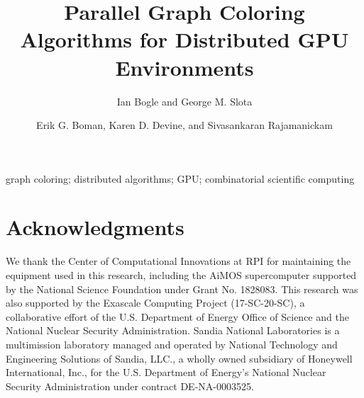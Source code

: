 \documentclass[5p,times]{elsarticle}
\newcommand{\note}[1]{\noindent\textcolor{blue}{\bf #1}}
\begin{document}
\begin{frontmatter}

\title{Parallel Graph Coloring Algorithms for Distributed GPU Environments}

\author{Ian Bogle and George M. Slota}
\address{Department of Computer Science}
\address{Rensselaer Polytechnic Institute}
\address{Lally 317, 110 8th St}
\address{Troy, NY 12180}
\address{\{boglei,slotag\}@rpi.edu}


\author{Erik G. Boman, Karen D. Devine, and Sivasankaran Rajamanickam}
\address{Scalable Algorithms Department}
\address{Sandia National Laboratories, New Mexico}
\address{\{egboman,kddevin,srajama\}@sandia.gov}

\maketitle

\begin{abstract}

\end{abstract}


\begin{keyword}
graph coloring; distributed algorithms; GPU; combinatorial scientific computing
\end{keyword}

\end{frontmatter}










\section{Acknowledgments}


We thank the Center of Computational Innovations at RPI for maintaining the equipment used in this research, including the AiMOS supercomputer supported by the National Science Foundation under Grant No. 1828083.
This research was also supported by the Exascale Computing Project (17-SC-20-SC), a collaborative effort of the U.S. Department of Energy Office of Science and the National Nuclear Security Administration. Sandia National Laboratories is a multimission laboratory managed and operated by National Technology and Engineering Solutions of Sandia, LLC., a wholly owned subsidiary of Honeywell International, Inc., for the U.S. Department of Energy's National Nuclear Security Administration under contract DE-NA-0003525.
\end{document}
